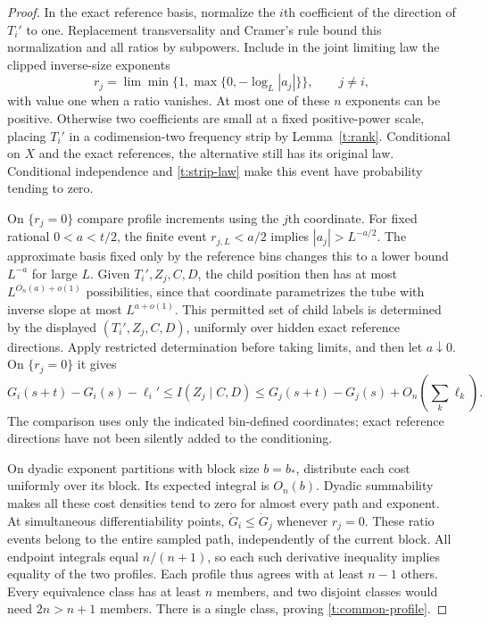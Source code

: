\begin{proof}
In the exact reference basis, normalize the $i$th coefficient of the
direction of $T_i'$ to one.  Replacement transversality and Cramer's
rule bound this normalization and all ratios by subpowers.  Include in
the joint limiting law the clipped inverse-size exponents
\[
 r_j=\lim\min\{1,\max\{0,-\log_L|a_j|\}\},\qquad j\ne i,
\]
with value one when a ratio vanishes.  At most one of these $n$ exponents
can be positive.  Otherwise two coefficients are small at a fixed
positive-power scale, placing $T_i'$ in a codimension-two frequency
strip by Lemma~\ref{t:rank}.  Conditional on $X$ and the exact references,
the alternative still has its original law.  Conditional independence
and \eqref{t:strip-law} make this event have probability tending to zero.

On $\{r_j=0\}$ compare profile increments using the $j$th coordinate.
For fixed rational $0<a<t/2$, the finite event $r_{j,L}<a/2$ implies
$|a_j|>L^{-a/2}$.  The approximate basis fixed only by the reference
bins changes this to a lower bound $L^{-a}$ for large $L$.
Given $T_i',Z_j,C,D$, the child position then has at most
$L^{O_n(a)+o(1)}$ possibilities, since that coordinate parametrizes
the tube with inverse slope at most $L^{a+o(1)}$.  This permitted set of
child labels is determined by the displayed $(T_i',Z_j,C,D)$, uniformly
over hidden exact reference directions.
Apply restricted determination before taking limits, and then let
$a\downarrow0$.  On $\{r_j=0\}$ it gives
\[
 G_i(s+t)-G_i(s)-\ell_i'
       \le I(Z_j\mid C,D)
       \le G_j(s+t)-G_j(s)+O_n\left(\sum_k\ell_k\right).
\]
The comparison uses only the indicated bin-defined coordinates; exact
reference directions have not been silently added to the conditioning.

On dyadic exponent partitions with block size $b=b_*$, distribute each
cost uniformly over its block.  Its expected integral is $O_n(b)$.
Dyadic summability makes all these cost densities tend to zero for
almost every path and exponent.  At simultaneous differentiability
points, $\dot G_i\le\dot G_j$ whenever $r_j=0$.  These ratio events
belong to the entire sampled path, independently of the current block.
All endpoint integrals equal $n/(n+1)$, so each such derivative
inequality implies equality of the two profiles.  Each profile thus
agrees with at least $n-1$ others.  Every equivalence class has at least
$n$ members, and two disjoint classes would need $2n>n+1$ members.
There is a single class, proving \eqref{t:common-profile}.
\end{proof}

